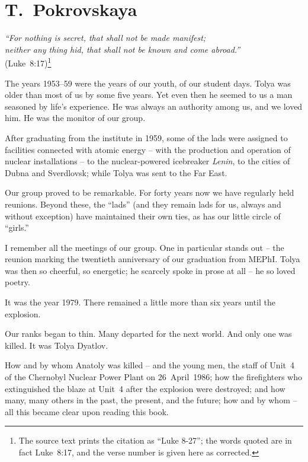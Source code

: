 \documentclass[openright]{bookest}
\begin{document}
\section*{T.~Pokrovskaya}

\begin{flushright}
\textit{``For nothing is secret, that shall not be made manifest;\\
neither any thing hid, that shall not be known and come abroad.''}\\
(Luke~8{:}17)\footnote{The source text prints the citation as ``Luke 8-27''; the words quoted are in fact Luke~8{:}17, and the verse number is given here as corrected.}
\end{flushright}

The years 1953--59 were the years of our youth, of our student days. Tolya was older than most of us by some five years. Yet even then he seemed to us a man seasoned by life's experience. He was always an authority among us, and we loved him. He was the monitor of our group.

After graduating from the institute in 1959, some of the lads were assigned to facilities connected with atomic energy -- with the production and operation of nuclear installations -- to the nuclear-powered icebreaker \textit{Lenin}, to the cities of Dubna and Sverdlovsk; while Tolya was sent to the Far East.

Our group proved to be remarkable. For forty years now we have regularly held reunions. Beyond these, the ``lads'' (and they remain lads for us, always and without exception) have maintained their own ties, as has our little circle of ``girls.''

I remember all the meetings of our group. One in particular stands out -- the reunion marking the twentieth anniversary of our graduation from MEPhI. Tolya was then so cheerful, so energetic; he scarcely spoke in prose at all -- he so loved poetry.

It was the year 1979. There remained a little more than six years until the explosion.

Our ranks began to thin. Many departed for the next world. And only one was killed. It was Tolya Dyatlov.

How and by whom Anatoly was killed -- and the young men, the staff of Unit~4 of the Chernobyl Nuclear Power Plant on 26~April~1986; how the firefighters who extinguished the blaze at Unit~4 after the explosion were destroyed; and how many, many others in the past, the present, and the future; how and by whom -- all this became clear upon reading this book.
\end{document}
